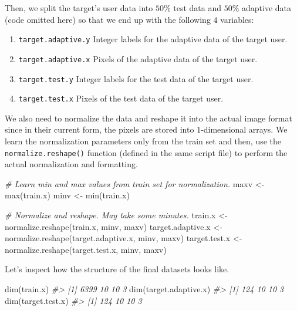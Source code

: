 \documentclass[
  11pt,
]{krantz}
\newenvironment{Shaded}{\begin{snugshade}}{\end{snugshade}}
\newcommand{\CommentTok}[1]{\textcolor[rgb]{0.37,0.37,0.37}{\textit{#1}}}
\newcommand{\FunctionTok}[1]{\textcolor[rgb]{0,0,0}{#1}}
\newcommand{\NormalTok}[1]{#1}
\newcommand{\OtherTok}[1]{\textcolor[rgb]{0.37,0.37,0.37}{#1}}
\providecommand{\tightlist}{%
  \setlength{\itemsep}{0pt}\setlength{\parskip}{0pt}}
\begin{document}
Then, we split the target's user data into \(50\%\) test data and \(50\%\) adaptive data (code omitted here) so that we end up with the following \(4\) variables:

\begin{enumerate}
\def\labelenumi{\arabic{enumi}.}
\tightlist
\item
  \texttt{target.adaptive.y} Integer labels for the adaptive data of the target user.
\item
  \texttt{target.adaptive.x} Pixels of the adaptive data of the target user.
\item
  \texttt{target.test.y} Integer labels for the test data of the target user.
\item
  \texttt{target.test.x} Pixels of the test data of the target user.
\end{enumerate}

We also need to normalize the data and reshape it into the actual image format since in their current form, the pixels are stored into \(1\)-dimensional arrays. We learn the normalization parameters only from the train set and then, use the \texttt{normalize.reshape()} function (defined in the same script file) to perform the actual normalization and formatting.

\begin{Shaded}
\begin{Highlighting}[]
\CommentTok{\# Learn min and max values from train set for normalization.}
\NormalTok{maxv }\OtherTok{\textless{}{-}} \FunctionTok{max}\NormalTok{(train.x)}
\NormalTok{minv }\OtherTok{\textless{}{-}} \FunctionTok{min}\NormalTok{(train.x)}

\CommentTok{\# Normalize and reshape. May take some minutes.}
\NormalTok{train.x }\OtherTok{\textless{}{-}} \FunctionTok{normalize.reshape}\NormalTok{(train.x, minv, maxv)}
\NormalTok{target.adaptive.x }\OtherTok{\textless{}{-}} \FunctionTok{normalize.reshape}\NormalTok{(target.adaptive.x, minv, maxv)}
\NormalTok{target.test.x }\OtherTok{\textless{}{-}} \FunctionTok{normalize.reshape}\NormalTok{(target.test.x, minv, maxv)}
\end{Highlighting}
\end{Shaded}

Let's inspect how the structure of the final datasets looks like.

\begin{Shaded}
\begin{Highlighting}[]
\FunctionTok{dim}\NormalTok{(train.x)}
\CommentTok{\#\textgreater{} [1] 6399   10   10    3}
\FunctionTok{dim}\NormalTok{(target.adaptive.x)}
\CommentTok{\#\textgreater{} [1] 124  10  10   3}
\FunctionTok{dim}\NormalTok{(target.test.x)}
\CommentTok{\#\textgreater{} [1] 124  10  10   3}
\end{Highlighting}
\end{Shaded}
\end{document}
